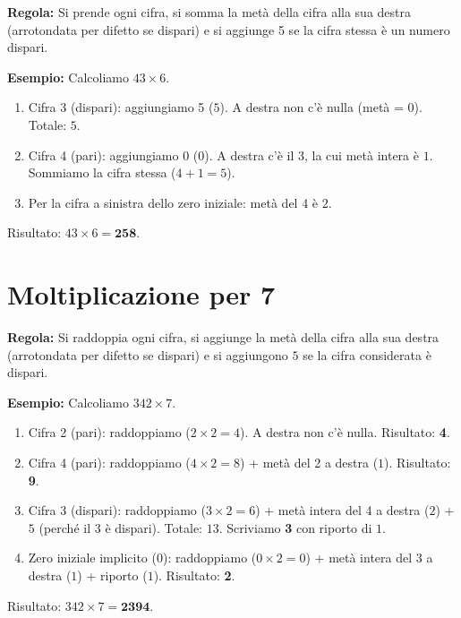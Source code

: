 \documentclass[11pt,a4paper]{article}
\begin{document}
\textbf{Regola:} Si prende ogni cifra, si somma la metà della cifra alla sua destra (arrotondata per difetto se dispari) e si aggiunge 5 se la cifra stessa è un numero dispari.

\textbf{Esempio:} Calcoliamo $43 \times 6$.
\begin{enumerate}
    \item Cifra 3 (dispari): aggiungiamo 5 ($5$). A destra non c'è nulla (metà = 0). Totale: $5$.
    \item Cifra 4 (pari): aggiungiamo 0 ($0$). A destra c'è il 3, la cui metà intera è $1$. Sommiamo la cifra stessa ($4 + 1 = 5$).
    \item Per la cifra a sinistra dello zero iniziale: metà del 4 è $2$.
\end{enumerate}
Risultato: $43 \times 6 = \mathbf{258}$.

\section{Moltiplicazione per 7}

\textbf{Regola:} Si raddoppia ogni cifra, si aggiunge la metà della cifra alla sua destra (arrotondata per difetto se dispari) e si aggiungono $5$ se la cifra considerata è dispari.

\textbf{Esempio:} Calcoliamo $342 \times 7$.
\begin{enumerate}
    \item Cifra 2 (pari): raddoppiamo ($2 \times 2 = 4$). A destra non c'è nulla. Risultato: \textbf{4}.
    \item Cifra 4 (pari): raddoppiamo ($4 \times 2 = 8$) + metà del 2 a destra ($1$). Risultato: \textbf{9}.
    \item Cifra 3 (dispari): raddoppiamo ($3 \times 2 = 6$) + metà intera del 4 a destra ($2$) + $5$ (perché il 3 è dispari). Totale: $13$. Scriviamo \textbf{3} con riporto di $1$.
    \item Zero iniziale implicito ($0$): raddoppiamo ($0 \times 2 = 0$) + metà intera del 3 a destra ($1$) + riporto ($1$). Risultato: \textbf{2}.
\end{enumerate}
Risultato: $342 \times 7 = \mathbf{2394}$.
\end{document}
